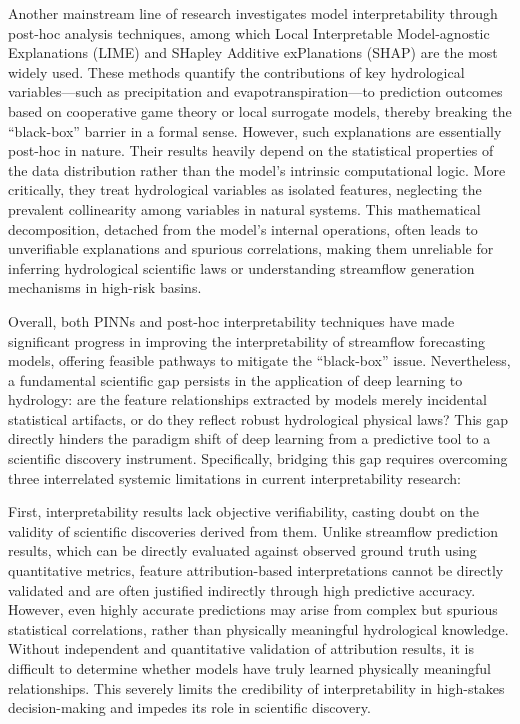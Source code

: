 Another mainstream line of research investigates model interpretability through post-hoc analysis techniques, among which Local Interpretable Model-agnostic Explanations (LIME)\cite{Ribeiro2016_LIME_Origin} and SHapley Additive exPlanations (SHAP)\cite{lundberg2017_Shap_Origin} are the most widely used. These methods quantify the contributions of key hydrological variables—such as precipitation and evapotranspiration—to prediction outcomes based on cooperative game theory or local surrogate models\cite{Wagan2026_LIME}, thereby breaking the “black-box” barrier in a formal sense. However, such explanations are essentially post-hoc in nature. Their results heavily depend on the statistical properties of the data distribution rather than the model's intrinsic computational logic. More critically, they treat hydrological variables as isolated features, neglecting the prevalent collinearity among variables in natural systems. This mathematical decomposition, detached from the model's internal operations, often leads to unverifiable explanations and spurious correlations, making them unreliable for inferring hydrological scientific laws or understanding streamflow generation mechanisms in high-risk basins.

Overall, both PINNs and post-hoc interpretability techniques have made significant progress in improving the interpretability of streamflow forecasting models, offering feasible pathways to mitigate the “black-box” issue. Nevertheless, a fundamental scientific gap persists in the application of deep learning to hydrology: are the feature relationships extracted by models merely incidental statistical artifacts, or do they reflect robust hydrological physical laws? This gap directly hinders the paradigm shift of deep learning from a predictive tool to a scientific discovery instrument. Specifically, bridging this gap requires overcoming three interrelated systemic limitations in current interpretability research:

First, interpretability results lack objective verifiability\cite{NEURIPS2021_shap_residuals}, casting doubt on the validity of scientific discoveries derived from them. Unlike streamflow prediction results, which can be directly evaluated against observed ground truth using quantitative metrics, feature attribution-based interpretations cannot be directly validated and are often justified indirectly through high predictive accuracy\cite{TAKEFUJI2026_Shap_problem}. However, even highly accurate predictions may arise from complex but spurious statistical correlations\cite{e24050687_Shap_problem}, rather than physically meaningful hydrological knowledge. Without independent and quantitative validation of attribution results, it is difficult to determine whether models have truly learned physically meaningful relationships\cite{Benchmarkingofa_PhysicallyBasedHydrologicModel}. This severely limits the credibility of interpretability in high-stakes decision-making and impedes its role in scientific discovery.

